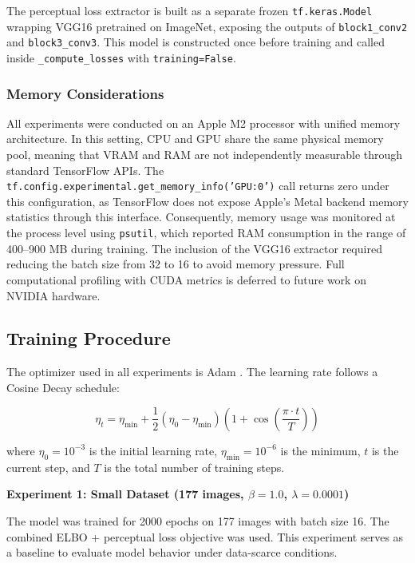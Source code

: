 \documentclass[11pt,a4paper]{article}
\begin{document}
The perceptual loss extractor is built as a separate frozen \texttt{tf.keras.Model} wrapping VGG16 pretrained on ImageNet, exposing the outputs of \texttt{block1\_conv2} and \texttt{block3\_conv3}. This model is constructed once before training and called inside \texttt{\_compute\_losses} with \texttt{training=False}.

\subsubsection{Memory Considerations}

All experiments were conducted on an Apple M2 processor with unified memory architecture. In this setting, CPU and GPU share the same physical memory pool, meaning that VRAM and RAM are not independently measurable through standard TensorFlow APIs. The \texttt{tf.config.experimental.get\_memory\_info('GPU:0')} call returns zero under this configuration, as TensorFlow does not expose Apple's Metal backend memory statistics through this interface. Consequently, memory usage was monitored at the process level using \texttt{psutil}, which reported RAM consumption in the range of 400--900 MB during training. The inclusion of the VGG16 extractor required reducing the batch size from 32 to 16 to avoid memory pressure. Full computational profiling with CUDA metrics is deferred to future work on NVIDIA hardware.

\subsection{Training Procedure}

The optimizer used in all experiments is Adam \cite{kingma2014adam}. The learning rate follows a Cosine Decay schedule:

\begin{equation}
    \eta_t = \eta_{\min} + \frac{1}{2}(\eta_0 - \eta_{\min})\left(1 + \cos\left(\frac{\pi \cdot t}{T}\right)\right)
\end{equation}

where $\eta_0 = 10^{-3}$ is the initial learning rate, $\eta_{\min} = 10^{-6}$ is the minimum, $t$ is the current step, and $T$ is the total number of training steps.

\textbf{Experiment 1: Small Dataset (177 images, $\beta = 1.0$, $\lambda = 0.0001$)}

The model was trained for 2000 epochs on 177 images with batch size 16. The combined ELBO + perceptual loss objective was used. This experiment serves as a baseline to evaluate model behavior under data-scarce conditions.
\end{document}
